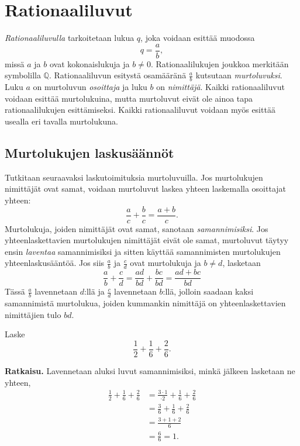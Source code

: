 \chapter{Rationaaliluvut}
    \label{rationaaliluvut}
    
    \emph{Rationaaliluvulla} tarkoitetaan lukua $q$, joka voidaan esittää muodossa
    \[
    q=\frac{a}{b}, 
    \]
    missä $a$ ja $b$ ovat kokonaislukuja ja $b\neq 0$. Rationaalilukujen joukkoa
    merkitään symbolilla $\mathbb{Q}$. Rationaaliluvun esitystä osamääränä
    $\frac{a}{b}$ kutsutaan \emph{murtoluvuksi}. Luku $a$ on murtoluvun
    \emph{osoittaja} ja luku $b$ on \emph{nimittäjä}. Kaikki rationaaliluvut
    voidaan esittää murtolukuina, mutta murtoluvut eivät ole ainoa tapa
    rationaalilukujen esittämiseksi. Kaikki rationaaliluvut voidaan myös
    esittää usealla eri tavalla murtolukuna.
    

\section{Murtolukujen laskusäännöt}

    Tutkitaan seuraavaksi laskutoimituksia murtoluvuilla. Jos murtolukujen
    nimittäjät ovat samat, voidaan murtoluvut laskea yhteen laskemalla
    osoittajat yhteen:
    \[
    \frac{a}{c} + \frac{b}{c} = \frac{a+b}{c}.
    \]
    Murtolukuja, joiden nimittäjät ovat samat, sanotaan \emph{samannimisiksi}.
    Jos yhteenlaskettavien murtolukujen nimittäjät eivät ole samat, murtoluvut
    täytyy ensin \emph{laventaa} samannimisiksi ja sitten käyttää samannimisten
    murtolukujen yhteenlaskusääntöä.
    Jos siis $\frac{a}{b}$ ja $\frac{c}{d}$ ovat murtolukuja ja $b\neq d$, lasketaan
    \[
    \frac{a}{b} + \frac{c}{d} = \frac{ad}{bd} + \frac{bc}{bd} = \frac{ad+bc}{bd}
    \]
    Tässä $\frac{a}{b}$ lavennetaan $d$:llä ja $\frac{c}{d}$ lavennetaan
    $b$:llä, jolloin saadaan kaksi samannimistä murtolukua, joiden kummankin
    nimittäjä on yhteenlaskettavien nimittäjien tulo $bd$.
    
    \begin{esimerkki}
        Laske
        \[
        \frac{1}{2} + \frac{1}{6} + \frac{2}{6}.
        \]
        
        \textbf{Ratkaisu.}
        Lavennetaan aluksi luvut samannimisiksi, minkä jälkeen lasketaan ne yhteen,
        \begin{eqnarray*}
            \frac{1}{2} + \frac{1}{6} + \frac{2}{6}
            &=
            \frac{3\cdot 1}{\cdot 2} + \frac{1}{6} + \frac{2}{6}\\
            &=
            \frac{3}{6} + \frac{1}{6} + \frac{2}{6}\\
            &= \frac{3+1+2}{6}\\ &= \frac{6}{6} = 1.
        \end{eqnarray*}
    \end{esimerkki}
    
